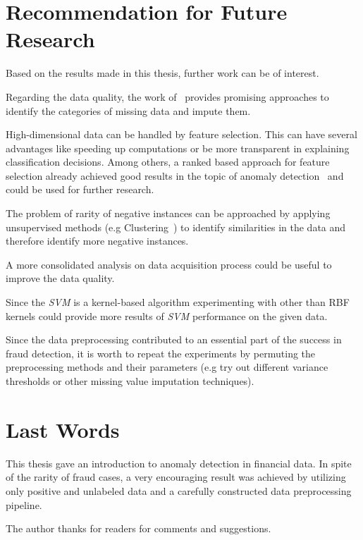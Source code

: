 \section{Recommendation for Future Research}\label{ch:rec}

Based on the results made in this thesis, further work can be of interest.

Regarding the data quality, the work of~\cite{Mohan;Pearl:2014} provides promising approaches to identify the categories of missing data and impute them.

High-dimensional data can be handled by feature selection. This can have several advantages like speeding up computations or be more transparent in explaining classification decisions. Among others, a ranked based approach for feature selection already achieved good results in the topic of anomaly detection~\cite{journals/ahswn/LiZLH13} and could be used for further research. 

The problem of rarity of negative instances can be approached by applying unsupervised methods (e.g Clustering~\cite{conf/ijcnn/AlzateS12}) to identify similarities in the data and therefore identify more negative instances. 

A more consolidated analysis on data acquisition process could be useful to improve the data quality. 

Since the \textit{SVM} is a kernel-based algorithm experimenting with other than RBF kernels could provide more results of \textit{SVM} performance on the given data.

Since the data preprocessing contributed to an essential part of the success in fraud detection, it is worth to repeat the experiments by permuting the preprocessing methods and their parameters (e.g try out different variance thresholds or other missing value imputation techniques).

\section{Last Words}\label{ch:lw}

This thesis gave an introduction to anomaly detection in financial data. In spite of the rarity of fraud cases, a very encouraging result was achieved by utilizing only positive and unlabeled data and a carefully constructed data preprocessing pipeline. 

The author thanks for readers for comments and suggestions.













